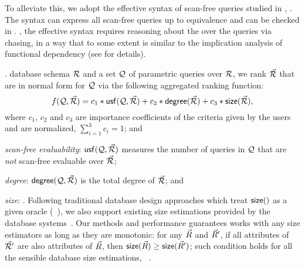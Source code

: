 \vspace{0.36ex}
To alleviate this, we adopt the effective syntax of scan-free
\SQL queries studied in \cite{VLDB19}, . The syntax can express
all scan-free \SQL queries up to equivalence and can be checked in
\PTIME. , the effective syntax requires reasoning about the \bss
over the queries via chasing, in a way that to some extent is
similar to the implication analysis of functional dependency
(see \cite{full} for details).


.  database schema ${\mathcal R}$ and a set $\mathcal Q$ of parametric
queries over ${\mathcal R}$, we rank \bds $\vec{{\mathcal R}}$ that are in normal
form for $\mathcal Q$ via the following aggregated ranking function:
\vspace{-0.7ex}
\[f(\Q, \kb{\R}) = c_{1}*\usf(\Q, \ak \kb{\R}) + c_{2}*\deg(\kb{\R}) + \ak c_{3}*\size(\kb{\R}),
\vspace{-0.7ex}\]
where $c_{1}$, $c_{2}$ and $c_{3}$ are importance coefficients
of the criteria given by the users and are normalized, \ie
$\sum_{i=1}^{3}c_{i} = 1$; and
\be
  \item {\em scan-free evaluability}: ${\mathsf{usf}}(\mathcal Q, \vec{{\mathcal R}})$ measures
  the number of
queries in $\mathcal Q$ that are {\em not} scan-free evaluable over $\vec{{\mathcal R}}$;
  \item {\em degree}: ${\mathsf{degree}}(\mathcal Q, \vec{{\mathcal R}})$ is the total degree of $\vec{{\mathcal R}}$;
    and
  \item {\em size}: .
  \ee
Following traditional database design approaches which treat
${\mathsf{size}}()$ as a given oracle (\eg~\cite{PapadomanolakisA07}), we
also support existing size estimations provided by the
database systems~\cite{BrunoCKNRS11}.  Our methods and
performance guarantees works with any size estimators as long as
they are monotonic: for any $\vec{R}$ and $\vec{R}'$, if all
attributes of $\vec{{\mathcal R}}'$ are also attributes of $\vec{R}$, then
${\mathsf{size}}(\vec{R})\geq {\ensuremath {\mathsf{size}}}(\vec{R}')$; such condition holds for all
the sensible database size estimations, \eg~\cite{PapadomanolakisA07,BrunoCKNRS11}.


